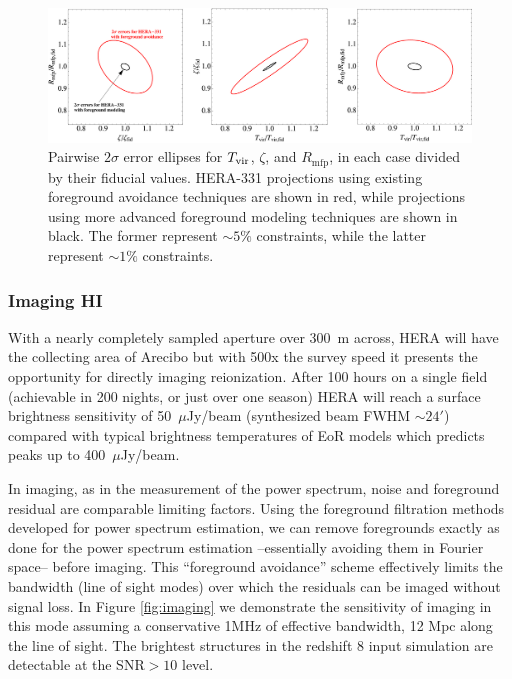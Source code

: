 \documentclass[preprint]{aastex}
\begin{document}
\begin{figure}[t]\centering
\includegraphics[width=\textwidth]{plots/Pspec/OPTMIDellipses.pdf}
\caption{\small
Pairwise $2\sigma$ error ellipses for $T_{\rm vir}$, $\zeta$, and $R_\textrm{mfp}$, in each case divided by their fiducial values.  HERA-331 projections using existing foreground avoidance techniques are shown in red, while projections using more advanced foreground modeling techniques are shown in black.  The former represent $\sim 5\%$ constraints, while the latter represent $\sim 1\%$ constraints.\label{fig:ErrorEllipses}}
\end{figure}


\subsubsection{Imaging HI}
\label{sec:imaging_HI}
With a nearly completely sampled aperture over 300~m across, HERA will have the collecting area of Arecibo but 
with 500x the survey speed it presents the opportunity for directly imaging reionization.  After 100 hours on a 
single field (achievable in 200 nights, or just over one season) HERA will reach a surface brightness sensitivity 
of 50~$\mu$Jy/beam (synthesized beam FWHM $\sim 24'$) compared with typical brightness temperatures of EoR models 
which predicts peaks up to 400~$\mu$Jy/beam.

In imaging, as in the measurement of the power spectrum, noise and foreground residual are comparable limiting 
factors. Using the foreground filtration methods developed for power spectrum estimation, we can remove 
foregrounds exactly as done for the power spectrum estimation --essentially avoiding them in Fourier space-- before imaging.  This ``foreground avoidance'' scheme effectively limits the bandwidth (line of sight 
modes) over which the residuals can be imaged without signal loss.  In Figure \ref{fig:imaging} we demonstrate the 
sensitivity of imaging in this mode assuming a conservative 1MHz of effective bandwidth, 12 Mpc along the line of 
sight.  The brightest structures in the redshift 8 input simulation are detectable at the SNR$>10$ level.
\end{document}
